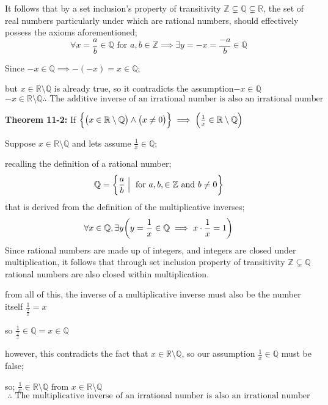 \documentclass{article}
\newcommand{\paren}[1]{\mathopen{}\left( {#1}_{{}_{}}\,\negthickspace\right)\mathclose{}} %
\newcommand{\braces}[1]{\mathopen{}\left\{ {#1}_{{}_{}}\,\negthickspace\right\}\mathclose{}}
\begin{document}
\begin{enumerate}[start = 8, label = {\bfseries Problem \arabic*:}, leftmargin=1in]
    It follows that by a set inclusion's property of transitivity \(\mathbb{Z} \subsetneq \mathbb{Q} \subsetneq \mathbb{R}\), the set of real
    numbers particularly under which are rational numbers, should effectively possess the axioms aforementioned;
    \[
        \forall x = \frac{a}{b} \in \mathbb{Q} \text{ for } a, b \in \mathbb{Z} \implies \exists y = -x = \frac{-a}{b} \in \mathbb{Q} 
    \]

    Since \(-x \in \mathbb{Q} \implies -(-x) = x \in \mathbb{Q}\);

    but \(x \in \mathbb{R} \setminus \mathbb{Q}\) is already true, so it contradicts the assumption\(-x \in \mathbb{Q}\)
    \[
        -x \in \mathbb{R} \setminus \mathbb{Q} \therefore \text { The additive inverse of an irrational number is also an 
        irrational number} 
    \]
    
    \textbf{Theorem 11-2:} If \(\braces{\paren{x \in \mathbb{R \setminus Q}} \land \paren{x \neq 0}} \implies \paren
    {\frac{1}{x} \in \mathbb{R \setminus Q}}\)  
    
    Suppose \(x \in \mathbb{R \setminus Q}\) and lets assume \(\frac{1}{x} \in \mathbb{Q}\);

    recalling the definition of a rational number;
    \[
        \mathbb{Q} = \braces{\frac{a}{b} \mathrel{\Big|} \text{ for } a, b, \in \mathbb{Z} \text{ and } b \neq 0}
    \]
    that is derived from the definition of the multiplicative inverses;
    \[
        \forall x \in \mathbb{Q}, \exists y\paren{y = \frac{1}{x} \in \mathbb{Q} \implies x\cdot \frac{1}{x} = 1} 
    \]
    Since rational numbers are made up of integers, and integers are closed under multiplication, it follows that 
    through set inclusion property of transitivity \(\mathbb{Z} \subsetneq \mathbb{Q}\) rational numbers are also 
    closed within multiplication.

    from all of this, the inverse of a multiplicative inverse must also be the number itself \(\frac{1}{\frac{1}{x}} = x\)
    
    so \(\frac{1}{\frac{1}{x}} \in \mathbb{Q} = x \in \mathbb{Q}\)

    however, this contradicts the fact that \(x \in \mathbb{R \setminus Q}\), so our assumption \(\frac{1}{x} \in \mathbb{Q}\) 
    must be false;
    
    so; \(\frac{1}{x} \in \mathbb{R \setminus Q} \text{ from } x \in \mathbb{R \setminus Q}\)
    \[
        \therefore \text{ The multiplicative inverse of an irrational number is also an irrational number}
    \]


\end{enumerate}
\end{document}
